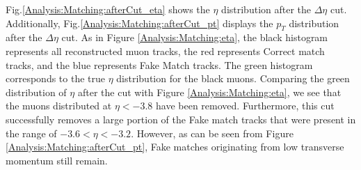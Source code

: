             Fig.\ref{Analysis:Matching:afterCut_eta} shows the \(\eta\) distribution after the \(\Delta \eta\) cut. Additionally, Fig.\ref{Analysis:Matching:afterCut_pt} displays the \(p_T\) distribution after the \(\Delta \eta\) cut. As in Figure \ref{Analysis:Matching:eta}, the black histogram represents all reconstructed muon tracks, the red represents Correct match tracks, and the blue represents Fake Match tracks. The green histogram corresponds to the true \(\eta\) distribution for the black muons. Comparing the green distribution of \(\eta\) after the cut with Figure \ref{Analysis:Matching:eta}, we see that the muons distributed at \(\eta < -3.8\) have been removed. Furthermore, this cut successfully removes a large portion of the Fake match tracks that were present in the range of \(-3.6 < \eta < -3.2\). However, as can be seen from Figure \ref{Analysis:Matching:afterCut_pt}, Fake matches originating from low transverse momentum still remain.
